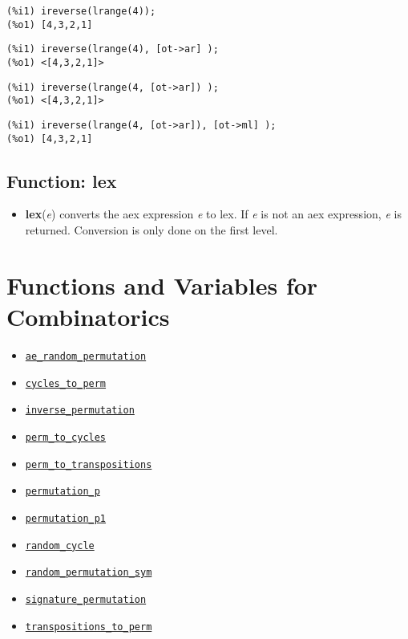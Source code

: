\documentclass[]{article}
\begin{document}

\begin{Verbatim}[frame=single]
(%i1) ireverse(lrange(4));
(%o1) [4,3,2,1]
\end{Verbatim}

\begin{Verbatim}[frame=single]
(%i1) ireverse(lrange(4), [ot->ar] );
(%o1) <[4,3,2,1]>
\end{Verbatim}

\begin{Verbatim}[frame=single]
(%i1) ireverse(lrange(4, [ot->ar]) );
(%o1) <[4,3,2,1]>
\end{Verbatim}

\begin{Verbatim}[frame=single]
(%i1) ireverse(lrange(4, [ot->ar]), [ot->ml] );
(%o1) [4,3,2,1]
\end{Verbatim}


\subsection{Function: lex\label{sec:lex}}
\hypertarget{lex}{}



\vspace{5 pt}
\begin{itemize}
\item[] {\bf lex}({\it e})
  converts the aex expression {\it e} to lex. If {\it e} is not an aex expression, {\it e} is returned. Conversion is only done on the first level. 

\end{itemize}

\section{Functions and Variables for Combinatorics}
\begin{itemize}
\item \hyperlink{ae_random_permutation}{{\tt ae\_random\_permutation}}
\item \hyperlink{cycles_to_perm}{{\tt cycles\_to\_perm}}
\item \hyperlink{inverse_permutation}{{\tt inverse\_permutation}}
\item \hyperlink{perm_to_cycles}{{\tt perm\_to\_cycles}}
\item \hyperlink{perm_to_transpositions}{{\tt perm\_to\_transpositions}}
\item \hyperlink{permutation_p}{{\tt permutation\_p}}
\item \hyperlink{permutation_p1}{{\tt permutation\_p1}}
\item \hyperlink{random_cycle}{{\tt random\_cycle}}
\item \hyperlink{random_permutation_sym}{{\tt random\_permutation\_sym}}
\item \hyperlink{signature_permutation}{{\tt signature\_permutation}}
\item \hyperlink{transpositions_to_perm}{{\tt transpositions\_to\_perm}}
\end{itemize}
\end{document}

